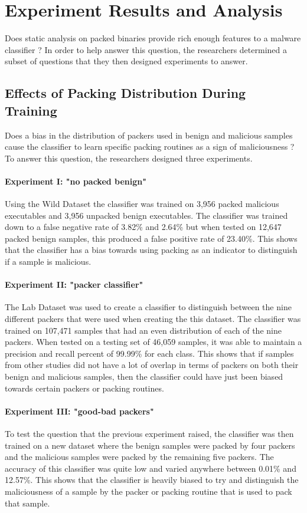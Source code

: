 \documentclass[sigconf]{acmart}
\begin{document}
\section{Experiment Results and Analysis}
\label{sec:results}

Does static analysis on packed binaries provide rich enough features to a malware classifier \cite{Aghakhani2020}? In order to help answer this question, the researchers determined a subset of questions that they then designed experiments to answer.

\subsection{Effects of Packing Distribution During Training}
Does a bias in the distribution of packers used in benign and malicious samples cause the classifier to learn specific packing routines as a sign of maliciousness \cite{Aghakhani2020}? To answer this question, the researchers designed three experiments.
\paragraph{Experiment I: "no packed benign"}
Using the Wild Dataset the classifier was trained on 3,956 packed malicious executables and 3,956 unpacked benign executables.
The classifier was trained down to a false negative rate of 3.82\% and 2.64\% but when tested on 12,647 packed benign samples, this produced a false positive rate of 23.40\%.
This shows that the classifier has a bias towards using packing as an indicator to distinguish if a sample is malicious.
\paragraph{Experiment II: "packer classifier"}
The Lab Dataset was used to create a classifier to distinguish between the nine different packers that were used when creating the this dataset.
The classifier was trained on 107,471 samples that had an even distribution of each of the nine packers.
When tested on a testing set of 46,059 samples, it was able to maintain a precision and recall percent of 99.99\% for each class.
This shows that if samples from other studies did not have a lot of overlap in terms of packers on both their benign and malicious samples, then the classifier could have just been biased towards certain packers or packing routines.
\paragraph{Experiment III: "good-bad packers"}
To test the question that the previous experiment raised, the classifier was then trained on a new dataset where the benign samples were packed by four packers and the malicious samples were packed by the remaining five packers.
The accuracy of this classifier was quite low and varied anywhere between 0.01\% and 12.57\%.
This shows that the classifier is heavily biased to try and distinguish the maliciousness of a sample by the packer or packing routine that is used to pack that sample.
\end{document}
